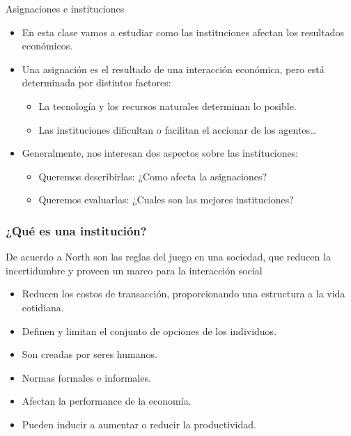 \documentclass{beamer}
\begin{document}
\begin{frame}{Asignaciones e instituciones}
    \begin{itemize}
        \item En esta clase vamos a estudiar como las instituciones afectan los resultados económicos.
        \item Una asignación es el resultado de una interacción económica, pero está determinada por distintos factores:
        \begin{itemize}
            \item La tecnología y los recursos naturales determinan lo posible.
            \item Las instituciones dificultan o facilitan el accionar de los agentes\dots
        \end{itemize}
        \item Generalmente, nos interesan dos aspectos sobre las instituciones:
        \begin{itemize}
            \item Queremos describirlas: ¿Como afecta la asignaciones?
            \item Queremos evaluarlas: ¿Cuales son las mejores instituciones?
        \end{itemize}
    \end{itemize} 
\end{frame}

\begin{frame}
\frametitle{¿Qué es una institución?}
De acuerdo a North son las reglas del juego en una sociedad, que reducen la incertidumbre y proveen un marco para la interacción social
    \begin{itemize}
        \item Reducen los costos de transacción, proporcionando una estructura a la vida cotidiana.
        \item Definen y limitan el conjunto de opciones de los individuos.
        \item Son creadas por seres humanos.
        \item Normas formales e informales.
        \item Afectan la performance de la economía.
        \item Pueden inducir a aumentar o reducir la productividad.
    \end{itemize}
\end{frame}
\end{document}
